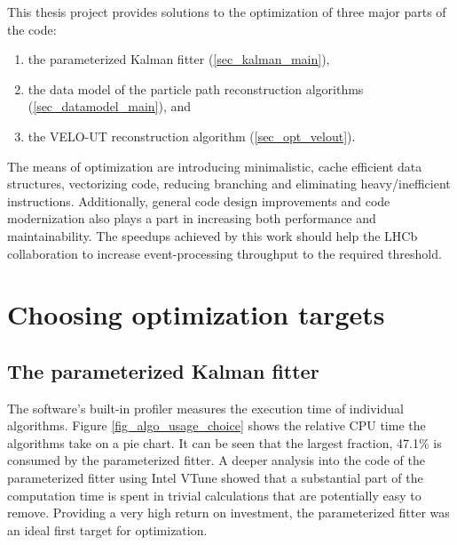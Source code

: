 \documentclass[12pt]{article}
\begin{document}
\vspace{1pc}
This thesis project provides solutions to the optimization of three major parts of the code:
\begin{enumerate}
	\item the parameterized Kalman fitter (\ref{sec_kalman_main}),
	\item the data model of the particle path reconstruction algorithms (\ref{sec_datamodel_main}), and
	\item the VELO-UT reconstruction algorithm (\ref{sec_opt_velout}).
\end{enumerate}
The means of optimization are introducing minimalistic, cache efficient data structures, vectorizing code, reducing branching and eliminating heavy/inefficient instructions. Additionally, general code design improvements and code modernization also plays a part in increasing both performance and maintainability. The speedups achieved by this work should help the LHCb collaboration to increase event-processing throughput to the required threshold.


\newpage
\section{Choosing optimization targets}

\subsection{The parameterized Kalman fitter}

The software's built-in profiler measures the execution time of individual algorithms. Figure \ref{fig_algo_usage_choice} shows the relative CPU time the algorithms take on a pie chart. It can be seen that the largest fraction, 47.1\% is consumed by the parameterized fitter. A deeper analysis into the code of the parameterized fitter using Intel VTune showed that a substantial part of the computation time is spent in trivial calculations that are potentially easy to remove. Providing a very high return on investment, the parameterized fitter was an ideal first target for optimization.
\end{document}
